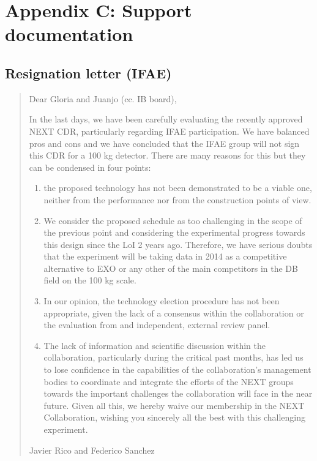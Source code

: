 \section{\bf \textsf{Appendix C: Support documentation}}

\subsection*{Resignation letter (IFAE)}


\begin{quotation}
Dear Gloria and Juanjo (cc. IB board),

In the last days, we have been carefully evaluating the recently approved NEXT CDR, particularly regarding IFAE participation. We have balanced pros and cons and we have concluded that the IFAE group will not sign this CDR for a 100 kg detector. There are many reasons for this but they can be condensed in four points:
\begin{enumerate}
\item the proposed technology has not been demonstrated to be a viable one, neither from the performance nor from the construction points of view.
\item We consider the proposed schedule as too challenging in the scope of the previous point and considering the experimental progress towards this design since the LoI 2 years ago. Therefore, we have serious doubts that the experiment will be taking data in 2014 as a competitive alternative to EXO or any other of the main competitors in the DB field on the 100 kg scale.
\item In our opinion, the technology election procedure has not been appropriate, given the lack of a consensus within the collaboration or the evaluation from and independent, external review panel.
\item The lack of information and scientific discussion within the collaboration, particularly during the critical past months, has led us to lose confidence in the capabilities of the collaboration’s management bodies to coordinate and integrate the efforts of the NEXT groups towards the important challenges the collaboration will face in the near future.
Given all this, we hereby waive our membership in the NEXT Collaboration, wishing you sincerely all the best with this challenging experiment.
\end{enumerate}
 
Javier Rico and Federico Sanchez
\end{quotation}

